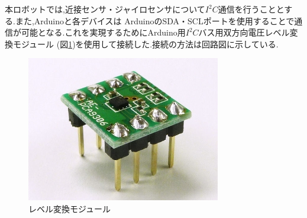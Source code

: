 \documentclass[10pt,a4j]{ujarticle}
\begin{document}
本ロボットでは,近接センサ・ジャイロセンサについて$I^2 C$通信を行うこととする.また,Arduinoと各デバイスは
ArduinoのSDA・SCLポートを使用することで通信が可能となる.これを実現するためにArduino用$I^2 C$バス用双方向電圧レベル変換モジュール
(図\ref{level})を使用して接続した.接続の方法は回路図に示している.

\begin{figure}[b]
 \centering
 \includegraphics[width=0.4\hsize]{./picture/level.png}
    \caption{レベル変換モジュール}
    \label{level}
\end{figure}
\end{document}
